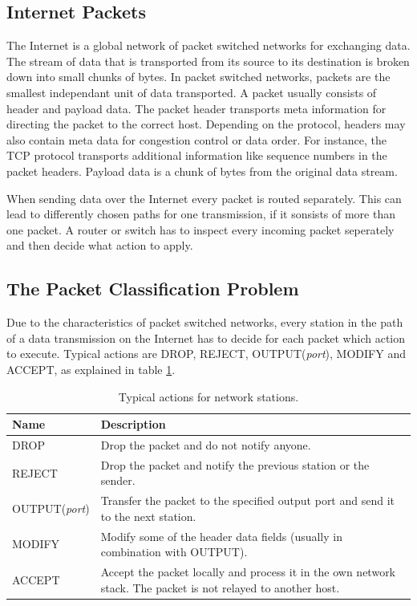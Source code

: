 \documentclass[a4paper,
		12pt,
		parskip=full,
		titlepage
		]{scrartcl}
\begin{document}
\subsection{Internet Packets}
The Internet is a global network of packet switched networks\cite[Chapter 1.1]{kurose_ross} for exchanging data. 
The stream of data that is transported from its source to its destination is broken down into small chunks of bytes.
In packet switched networks, packets are the smallest independant unit of data transported.
A packet usually consists of header and payload data.
The packet header transports meta information for directing the packet to the correct host.
Depending on the protocol, headers may also contain meta data for congestion control or data order.
For instance, the TCP protocol transports additional information like sequence numbers in the packet headers\cite[Chapter 3.5]{kurose_ross}.
Payload data is a chunk of bytes from the original data stream.

When sending data over the Internet every packet is routed separately.
This can lead to differently chosen paths for one transmission, if it sonsists of more than one packet.
A router or switch has to inspect every incoming packet seperately and then decide what action to apply.

\subsection{The Packet Classification Problem}
Due to the characteristics of packet switched networks, every station in the path of a data transmission on the Internet 
has to decide for each packet which action to execute.
Typical actions are DROP, REJECT, OUTPUT(\textit{port}), MODIFY and ACCEPT, as explained in table \ref{table:actions}.

\begin{table}
  \centering
  \begin{tabularx}{\textwidth}{l|X}
  Name&Description\\
  \hline
  DROP&Drop the packet and do not notify anyone.\\
  REJECT&Drop the packet and notify the previous station or the sender.\\
  OUTPUT(\textit{port})&Transfer the packet to the specified output port and send it to the next station.\\
  MODIFY&Modify some of the header data fields (usually in combination with OUTPUT).\\
  ACCEPT&Accept the packet locally and process it in the own network stack. The packet is not relayed to another host.\\
  \end{tabularx}
  \caption{Typical actions for network stations.}
  \label{table:actions}
\end{table}
\end{document}
